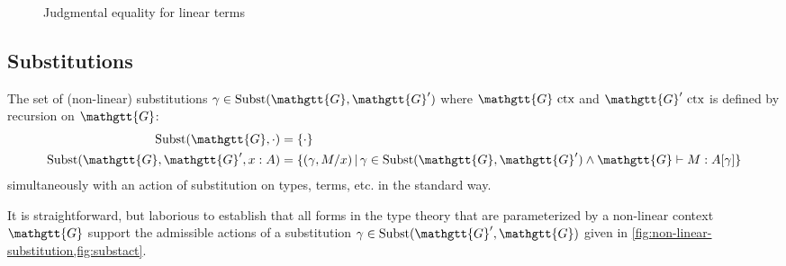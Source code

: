 \documentclass[acmsmall,nonacm]{acmart}
\renewcommand{\Gamma}{\mathgtt{G}}
\renewcommand{\Delta}{\mathgtt{D}}
\newcommand{\Subst}{\textrm{Subst}}
\newcommand{\isCtx}{\textrm{ ctx}}
\newcommand{\simulsubst}[2]{#1\{#2\}}
\newcommand{\subst}[3]{\simulsubst {#1} {#2/#3}}
\newcommand{\letin}[3]{\mathsf{let}\, #1 = #2 \, \mathsf{in}\, #3}
\newcommand{\applto}[2]{#1 \, #2}
\newcommand{\LinSigTyLimit}[3]{\bigoplus\limits_{#1 : #2} #3}
\newcommand{\equalizer}[3]{\{#1\,|\,\applto {#2}{#1} = \applto{#3}{#1} \}}
\newcommand{\equalizerin}[1]{\langle #1 \rangle}
\newcommand{\equalizerpi}[1]{#1.\pi}
\newcommand{\pipe}{\,|\,}
\begin{document}
\begin{figure}
  \caption{Judgmental equality for linear terms}
  \label{fig:jdgeq}
\end{figure}

\subsection{Substitutions}
\begin{definition}
  The set of (non-linear) substitutions $\gamma \in
  \textrm{Subst}(\Gamma,\Gamma')$ where $\Gamma \isCtx$ and $\Gamma'
  \isCtx$ is defined by recursion on $\Gamma$:
  \begin{align*}
    \textrm{Subst}(\Gamma,\cdot) &= \{\cdot \}\\
    \textrm{Subst}(\Gamma,\Gamma',x:A) &= \{ (\gamma,M/x) \pipe \gamma \in \textrm{Subst}(\Gamma,\Gamma') \wedge \Gamma \vdash M : A[\gamma] \}
  \end{align*}
  simultaneously with an action of substitution on types, terms,
  etc. in the standard way.

  It is straightforward, but laborious to establish that all forms in
  the type theory that are parameterized by a non-linear context
  $\Gamma$ support the admissible actions of a substitution $\gamma
  \in \Subst(\Gamma',\Gamma)$ given in \cref{fig:non-linear-substitution,fig:substact}.
\end{definition}
\end{document}
